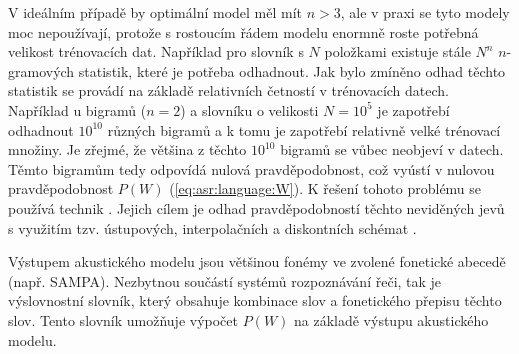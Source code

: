 \noindent V ideálním případě by optimální model měl mít $n > 3$, ale v praxi se tyto modely moc nepoužívají, protože s rostoucím řádem modelu enormně roste potřebná velikost trénovacích dat. Například pro slovník s $N$ položkami existuje stále $N^{n}$ $n$-gramových statistik, které je potřeba odhadnout. Jak bylo zmíněno odhad těchto statistik se provádí na základě relativních četností v trénovacích datech. Například u bigramů ($n=2$) a slovníku o velikosti $N=10^{5}$ je zapotřebí odhadnout $10^{10}$ různých bigramů a k tomu je zapotřebí relativně velké trénovací množiny. Je zřejmé, že většina z těchto $10^{10}$ bigramů se vůbec neobjeví v datech. Těmto  bigramům tedy odpovídá nulová pravděpodobnost, což vyústí v nulovou pravděpodobnost $P\left(W\right)$ (\ref{eq:asr:language:W}). K řešení tohoto problému se používá technik . Jejich cílem je odhad pravděpodobností těchto neviděných jevů s využitím tzv. ústupových, interpolačních a diskontních schémat \cite{Psutka2006}.

Výstupem akustického modelu jsou většinou fonémy ve zvolené fonetické abecedě (např. SAMPA). Nezbytnou součástí systémů rozpoznávání řeči, tak je výslovnostní slovník, který obsahuje kombinace slov a fonetického přepisu těchto slov.
Tento slovník umožňuje výpočet $P\left(W\right)$ na základě výstupu akustického modelu.
